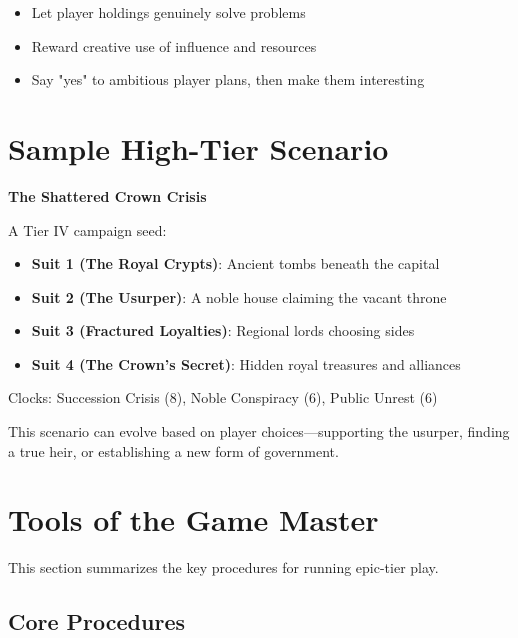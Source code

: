 \begin{itemize}
    \item Let player holdings genuinely solve problems
    \item Reward creative use of influence and resources
    \item Say "yes" to ambitious player plans, then make them interesting
\end{itemize}

\section{Sample High-Tier Scenario}

\textbf{The Shattered Crown Crisis}

A Tier IV campaign seed:
\begin{itemize}
    \item \textbf{Suit 1 (The Royal Crypts)}: Ancient tombs beneath the capital
    \item \textbf{Suit 2 (The Usurper)}: A noble house claiming the vacant throne
    \item \textbf{Suit 3 (Fractured Loyalties)}: Regional lords choosing sides
    \item \textbf{Suit 4 (The Crown's Secret)}: Hidden royal treasures and alliances
\end{itemize}

Clocks: Succession Crisis (8), Noble Conspiracy (6), Public Unrest (6)

This scenario can evolve based on player choices---supporting the usurper, finding a true heir, or establishing a new form of government.

\section{Tools of the Game Master}

This section summarizes the key procedures for running epic-tier play.

\subsection*{Core Procedures}

